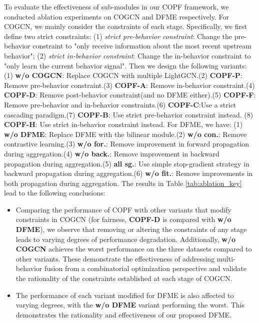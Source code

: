 To evaluate the effectiveness of sub-modules in our COPF framework, we conducted ablation experiments on COGCN and DFME respectively. For COGCN, we mainly consider the constraints of each stage. Specifically, we first define two strict constraints: (1) \textit{strict pre-behavior constraint}: Change the pre-behavior constraint to "only receive information about the most recent upstream behavior"; (2) \textit{strict in-behavior constraint}: Change the in-behavior constraint to "only learn the current behavior signal". Then we design the following variants: (1) \textbf{w/o COGCN}: Replace COGCN with multiple LightGCN.(2) \textbf{COPF-P}: Remove pre-behavior constraint.(3) \textbf{COPF-A}: Remove in-behavior constraint.(4) \textbf{COPF-D}: Remove post-behavior constraint(and no DFME either).(5) \textbf{COPF-F}: Remove pre-behavior and in-behavior constraints.(6) \textbf{COPF-C}:Use a strict cascading paradigm.(7) \textbf{COPF-B}: Use strict pre-behavior constraint instead. (8) \textbf{COPF-H}: Use strict in-behavior constraint instead. For DFME, we have: (1) \textbf{w/o DFME}: Replace DFME with the bilinear module.(2) \textbf{w/o con.}: Remove contrastive learning.(3) \textbf{w/o for.}: Remove improvement in forward propagation during aggregation.(4) \textbf{w/o back.}: Remove improvement in backward propagation during aggregation.(5) \textbf{all sg.}: Use simple stop-gradient strategy in backward propagation during aggregation.(6) \textbf{w/o fit.}: Remove improvements in both propagation during aggregation. The results in Table \ref{tab:ablation_key} lead to the following conclusions:
\begin{itemize}
\item Comparing the performance of COPF with other variants that modify constraints in COGCN (for fairness, \textbf{COPF-D} is compared with \textbf{w/o DFME}), we observe that removing or altering the constraints of any stage leads to varying degrees of performance degradation. Additionally, \textbf{w/o COGCN} achieves the worst performance on the three datasets compared to other variants. These demonstrate the effectiveness of addressing multi-behavior fusion from a combinatorial optimization perspective and validate the rationality of the constraints established at each stage of COGCN.
\item The performance of each variant modified for DFME is also affected to varying degrees, with the \textbf{w/o DFME} variant performing the worst. This demonstrates the rationality and effectiveness of our proposed DFME.

\end{itemize}


